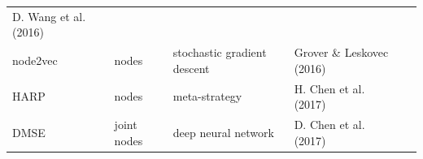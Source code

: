 \documentclass[11pt]{article}
\begin{document}
\begin{longtable}[]{@{}lllll@{}}
\begin{minipage}[t]{0.14\columnwidth}
D. Wang et al. (2016)\strut
\end{minipage} & \begin{minipage}[t]{0.29\columnwidth}\raggedright
\strut
\end{minipage}\tabularnewline
\begin{minipage}[t]{0.09\columnwidth}\raggedright
node2vec\strut
\end{minipage} & \begin{minipage}[t]{0.11\columnwidth}\raggedright
nodes\strut
\end{minipage} & \begin{minipage}[t]{0.23\columnwidth}\raggedright
stochastic gradient descent\strut
\end{minipage} & \begin{minipage}[t]{0.14\columnwidth}\raggedright
Grover \& Leskovec (2016)\strut
\end{minipage} & \begin{minipage}[t]{0.29\columnwidth}\raggedright
\strut
\end{minipage}\tabularnewline
\begin{minipage}[t]{0.09\columnwidth}\raggedright
HARP\strut
\end{minipage} & \begin{minipage}[t]{0.11\columnwidth}\raggedright
nodes\strut
\end{minipage} & \begin{minipage}[t]{0.23\columnwidth}\raggedright
meta-strategy\strut
\end{minipage} & \begin{minipage}[t]{0.14\columnwidth}\raggedright
H. Chen et al. (2017)\strut
\end{minipage} & \begin{minipage}[t]{0.29\columnwidth}\raggedright
\strut
\end{minipage}\tabularnewline
\begin{minipage}[t]{0.09\columnwidth}\raggedright
DMSE\strut
\end{minipage} & \begin{minipage}[t]{0.11\columnwidth}\raggedright
joint nodes\strut
\end{minipage} & \begin{minipage}[t]{0.23\columnwidth}\raggedright
deep neural network\strut
\end{minipage} & \begin{minipage}[t]{0.14\columnwidth}\raggedright
D. Chen et al. (2017)\strut
\end{minipage} & \begin{minipage}[t]{0.29\columnwidth}\raggedright

\end{minipage}
\end{longtable}
\end{document}
